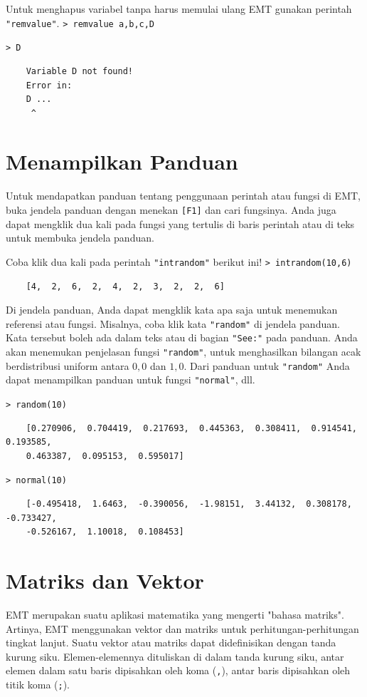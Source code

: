 \documentclass[11pt, a4paper]{article}
\newcommand{\emtcmd}[1]{\noindent\texttt{\textcolor{emtcommand}{>}\ #1}\par\smallskip}
\begin{document}
Untuk menghapus variabel tanpa harus memulai ulang EMT gunakan perintah \texttt{"remvalue"}.
\emtcmd{remvalue a,b,c,D}
\emtcmd{D}
\begin{verbatim}
    Variable D not found!
    Error in:
    D ...
     ^
\end{verbatim}

\section*{Menampilkan Panduan}

Untuk mendapatkan panduan tentang penggunaan perintah atau fungsi di EMT, buka jendela panduan dengan menekan \texttt{[F1]} dan cari fungsinya. Anda juga dapat mengklik dua kali pada fungsi yang tertulis di baris perintah atau di teks untuk membuka jendela panduan.

Coba klik dua kali pada perintah \texttt{"intrandom"} berikut ini!
\emtcmd{intrandom(10,6)}
\begin{verbatim}
    [4,  2,  6,  2,  4,  2,  3,  2,  2,  6]
\end{verbatim}

Di jendela panduan, Anda dapat mengklik kata apa saja untuk menemukan referensi atau fungsi. Misalnya, coba klik kata \texttt{"random"} di jendela panduan. Kata tersebut boleh ada dalam teks atau di bagian \texttt{"See:"} pada panduan. Anda akan menemukan penjelasan fungsi \texttt{"random"}, untuk menghasilkan bilangan acak berdistribusi uniform antara $0,0$ dan $1,0$. Dari panduan untuk \texttt{"random"} Anda dapat menampilkan panduan untuk fungsi \texttt{"normal"}, dll.

\emtcmd{random(10)}
\begin{verbatim}
    [0.270906,  0.704419,  0.217693,  0.445363,  0.308411,  0.914541,  0.193585,
    0.463387,  0.095153,  0.595017]
\end{verbatim}

\emtcmd{normal(10)}
\begin{verbatim}
    [-0.495418,  1.6463,  -0.390056,  -1.98151,  3.44132,  0.308178,  -0.733427,
    -0.526167,  1.10018,  0.108453]
\end{verbatim}

\section*{Matriks dan Vektor}

EMT merupakan suatu aplikasi matematika yang mengerti "bahasa matriks". Artinya, EMT menggunakan vektor dan matriks untuk perhitungan-perhitungan tingkat lanjut. Suatu vektor atau matriks dapat didefinisikan dengan tanda kurung siku. Elemen-elemennya dituliskan di dalam tanda kurung siku, antar elemen dalam satu baris dipisahkan oleh koma (\texttt{,}), antar baris dipisahkan oleh titik koma (\texttt{;}).
\end{document}
